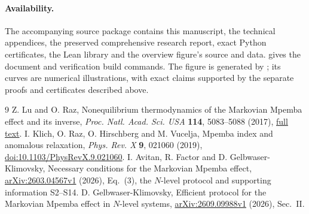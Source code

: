 \documentclass[11pt]{article}
\begin{document}
\paragraph{Availability.}
The accompanying source package contains this manuscript, the technical
appendices, the preserved comprehensive research report, exact Python
certificates, the Lean library and the overview figure's source and data.
 gives the document and verification build commands.
The figure is generated by ; its
curves are numerical illustrations, with exact claims supported by the
separate proofs and certificates described above.

\begin{thebibliography}{9}
 Z. Lu and O. Raz, Nonequilibrium thermodynamics of the
Markovian Mpemba effect and its inverse, \emph{Proc. Natl. Acad. Sci. USA}
\textbf{114}, 5083--5088 (2017),
\href{https://pmc.ncbi.nlm.nih.gov/articles/PMC5441807/}{full text}.
 I. Klich, O. Raz, O. Hirschberg and M. Vucelja,
Mpemba index and anomalous relaxation, \emph{Phys. Rev. X}
\textbf{9}, 021060 (2019),
\href{https://doi.org/10.1103/PhysRevX.9.021060}{doi:10.1103/PhysRevX.9.021060}.
 I. Avitan, R. Factor and D. Gelbwaser-Klimovsky,
Necessary conditions for the Markovian Mpemba effect,
\href{https://arxiv.org/abs/2603.04567v1}{arXiv:2603.04567v1} (2026),
Eq.~(3), the $N$-level protocol and supporting information S2--S14.
 D. Gelbwaser-Klimovsky,
Efficient protocol for the Markovian Mpemba effect in $N$-level systems,
\href{https://arxiv.org/abs/2609.09988v1}{arXiv:2609.09988v1} (2026),
Sec.~II.
\end{thebibliography}
\end{document}
